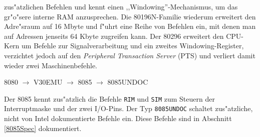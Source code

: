 \documentclass[12pt,a4paper,twoside]{report}
\newcommand{\tty}[1]{{\tt #1}}
\begin{document}
zus"atzlichen Befehlen und kennt einen ,,Windowing''-Mechanismus, um
das gr"o"sere interne RAM anzusprechen.  Die 80196N-Familie wiederum
erweitert den Adre"sraum auf 16 Mbyte und f"uhrt eine Reihe von
Befehlen ein, mit denen man auf Adressen jenseits 64 Kbyte zugreifen
kann.  Der 80296 erweitert den CPU-Kern um Befehle zur Signalverarbeitung
und ein zweites Windowing-Register, verzichtet jedoch auf den {\em
Peripheral Transaction Server} (PTS) und verliert damit wieder zwei
Maschinenbefehle.
\begin{cpulist}
   8080 $\rightarrow$ V30EMU $\rightarrow$ 8085 $\rightarrow$ 8085UNDOC
\end{cpulist}
Der 8085 kennt zus"atzlich die Befehle \tty{RIM} und \tty{SIM} zum Steuern der
Interruptmaske und der zwei I/O-Pins.  Der Typ {\tt 8085UNDOC} schaltet
zus"atzliche, nicht von Intel dokumentierte Befehle ein.  Diese Befehle
sind in Abschnitt \ref{8085Spec} dokumentiert.
\end{document}
